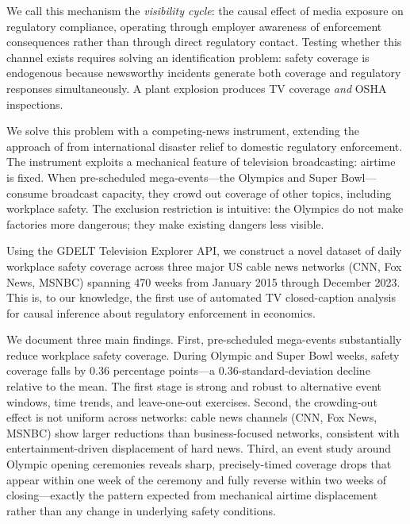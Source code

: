 \documentclass[12pt]{article}
\begin{document}
We call this mechanism the \emph{visibility cycle}: the causal effect of media exposure on regulatory compliance, operating through employer awareness of enforcement consequences rather than through direct regulatory contact. Testing whether this channel exists requires solving an identification problem: safety coverage is endogenous because newsworthy incidents generate both coverage and regulatory responses simultaneously. A plant explosion produces TV coverage \emph{and} OSHA inspections.

We solve this problem with a competing-news instrument, extending the approach of \citet{EisenseeStromberg2007} from international disaster relief to domestic regulatory enforcement. The instrument exploits a mechanical feature of television broadcasting: airtime is fixed. When pre-scheduled mega-events---the Olympics and Super Bowl---consume broadcast capacity, they crowd out coverage of other topics, including workplace safety. The exclusion restriction is intuitive: the Olympics do not make factories more dangerous; they make existing dangers less visible.

Using the GDELT Television Explorer API, we construct a novel dataset of daily workplace safety coverage across three major US cable news networks (CNN, Fox News, MSNBC) spanning 470 weeks from January 2015 through December 2023. This is, to our knowledge, the first use of automated TV closed-caption analysis for causal inference about regulatory enforcement in economics.

We document three main findings. First, pre-scheduled mega-events substantially reduce workplace safety coverage. During Olympic and Super Bowl weeks, safety coverage falls by 0.36 percentage points---a 0.36-standard-deviation decline relative to the mean. The first stage is strong and robust to alternative event windows, time trends, and leave-one-out exercises. Second, the crowding-out effect is not uniform across networks: cable news channels (CNN, Fox News, MSNBC) show larger reductions than business-focused networks, consistent with entertainment-driven displacement of hard news. Third, an event study around Olympic opening ceremonies reveals sharp, precisely-timed coverage drops that appear within one week of the ceremony and fully reverse within two weeks of closing---exactly the pattern expected from mechanical airtime displacement rather than any change in underlying safety conditions.
\end{document}
